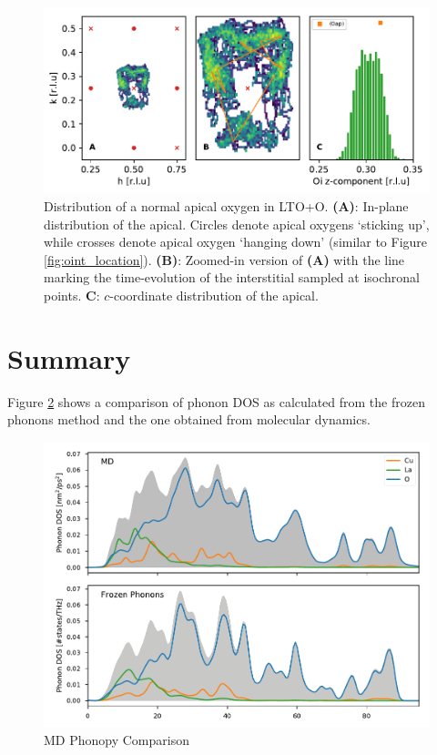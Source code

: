 \begin{figure}
	\centering
	\includegraphics[width=\textwidth]{fig/md/diffusion2.pdf}
	\caption[MD Oint Diffusion Oap 1]{Distribution of a normal apical oxygen in LTO+O. \textbf{(A)}: In-plane distribution of the apical. Circles denote apical oxygens `sticking up', while crosses denote apical oxygen `hanging down' (similar to Figure \ref{fig:oint_location}). \textbf{(B)}: Zoomed-in version of \textbf{(A)} with the line marking the time-evolution of the interstitial sampled at isochronal points. \textbf{C}: $c$-coordinate distribution of the apical.}
	\label{fig:md_diffusion2}
\end{figure}


\section{Summary}
Figure \ref{fig:md_phonopy_comparison} shows a comparison of phonon DOS as calculated from the frozen phonons method and the one obtained from molecular dynamics.

\begin{figure}
	\centering
	\includegraphics[width=\textwidth]{fig/md/md_phonopy_comparison.pdf}
	\caption[MD Phonopy Comparison]{MD Phonopy Comparison}
	\label{fig:md_phonopy_comparison}
\end{figure}


